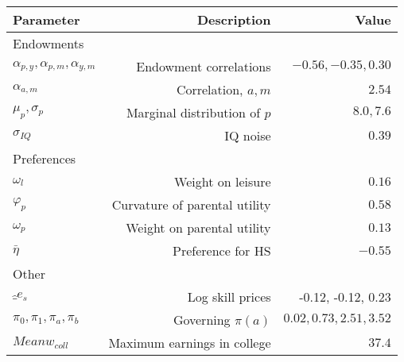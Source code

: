 \begin{tabular}{lrr}
\hline
Parameter & Description  & Value  \\
\hline
Endowments &   &   \\
$\alpha_{p,y}, \alpha_{p,m}, \alpha_{y,m}$ & Endowment correlations  & $-0.56, -0.35, 0.30$  \\
$\alpha_{a,m}$ & Correlation, $a,m$  & $2.54$  \\
$\mu_{p}, \sigma_{p}$ & Marginal distribution of $p$  & $8.0, 7.6$  \\
$\sigma_{IQ}$ & IQ noise  & $0.39$  \\
Preferences &   &   \\
$\omega_{l}$ & Weight on leisure  & $0.16$  \\
$\varphi_{p}$ & Curvature of parental utility  & $0.58$  \\
$\omega_{p}$ & Weight on parental utility  & $0.13$  \\
$\bar{\eta}$ & Preference for HS  & $-0.55$  \\
Other &   &   \\
$\hat_{e}_{s}$ & Log skill prices  & -0.12, -0.12, 0.23  \\
$\pi_{0}, \pi_{1}, \pi_{a}, \pi_{b}$ & Governing $\pi(a)$  & $0.02, 0.73, 2.51, 3.52$  \\
$Mean w_{coll}$ & Maximum earnings in college  & $37.4$  \\
\hline
\end{tabular}%
